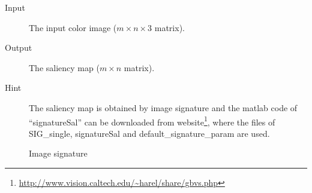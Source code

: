 \documentclass[12pt]{article}
\begin{document}
\begin{description}
\item[Input] The input color image ($m \times n \times 3$ matrix).
\item[Output] The saliency map ($m \times n$ matrix).
\item[Hint] The saliency map is obtained by image signature and the matlab  code of ``signatureSal'' can be downloaded from website\footnote{\url{http://www.vision.caltech.edu/~harel/share/gbvs.php}}, where the files of SIG\_single, signatureSal and default\_signature\_param are used.
\end{description}

\begin{figure}[!ht]
  \centering 
  \caption{Image signature}
  \label{fig: } %
\end{figure}
\end{document}
